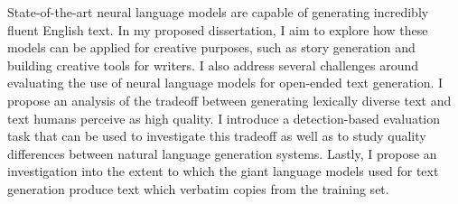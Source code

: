 \begin{center}
{\Large \mytitle}

\vspace{2cm}

{\Large{}}
\end{center}

State-of-the-art neural language models are capable of generating incredibly fluent English text.
In my proposed dissertation, I aim to explore how these models can be applied for creative purposes, such as story generation and building creative tools for writers.
I also address several challenges around evaluating the use of neural language models for open-ended text generation.
I propose an analysis of the tradeoff between generating lexically diverse text and text humans perceive as high quality.
I introduce a detection-based evaluation task that can be used to investigate this tradeoff as well as to study quality differences between natural language generation systems.
Lastly, I propose an investigation into the extent to which the giant language models used for text generation produce text which verbatim copies from the training set.
